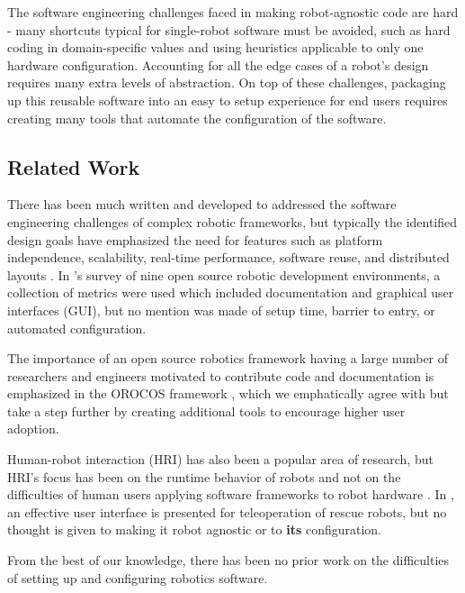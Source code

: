 \documentclass[10pt,journal,compsoc]{joser1}
\begin{document}
{The software engineering challenges faced in making robot-agnostic code are hard - many shortcuts typical for single-robot software must be avoided, such as hard coding in domain-specific values and using heuristics applicable to only one hardware configuration. Accounting for all the edge cases of a robot's design requires many extra levels of abstraction. On top of these challenges, packaging up this reusable software into an easy to setup experience for end users requires creating many tools that automate the configuration of the software.

\subsection{Related Work}

There has been much written and developed to addressed the software engineering challenges of complex robotic frameworks, but typically the identified design goals have emphasized the need for features such as platform independence, scalability, real-time performance, software reuse, and distributed layouts \cite{realtime_framework, collett2005player, kramer2007development}. In \cite{kramer2007development}'s survey of nine open source robotic development environments, a collection of metrics were used which included documentation and graphical user interfaces (GUI), but no mention was made of setup time, barrier to entry, or automated configuration. 

The importance of an open source robotics framework having a large number of researchers and engineers motivated to contribute code and documentation is emphasized in the OROCOS framework \cite{bruyninckx2001open}, which we emphatically agree with but take a step further by creating additional tools to encourage higher user adoption.
  
Human-robot interaction (HRI) has also been a popular area of research, but HRI's focus has been on the runtime behavior of robots and not on the difficulties of human users applying software frameworks to robot hardware \cite{hci_metrics, yancotaxonomy, goodrichseven}. In \cite{rescueRobots}, an effective user interface is presented for teleoperation of rescue robots, but no thought is given to making it robot agnostic or to \textbf{its} configuration. 

From the best of our knowledge, there has been no prior work on the difficulties of setting up and configuring robotics software.

}
\end{document}
